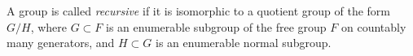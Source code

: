 A group is called \textit{recursive} if it is isomorphic to a quotient group of the form $G/H$, where $G \subset F$ is an enumerable subgroup of the free group $F$ on countably many generators, and $H \subset G$ is an enumerable normal subgroup.
